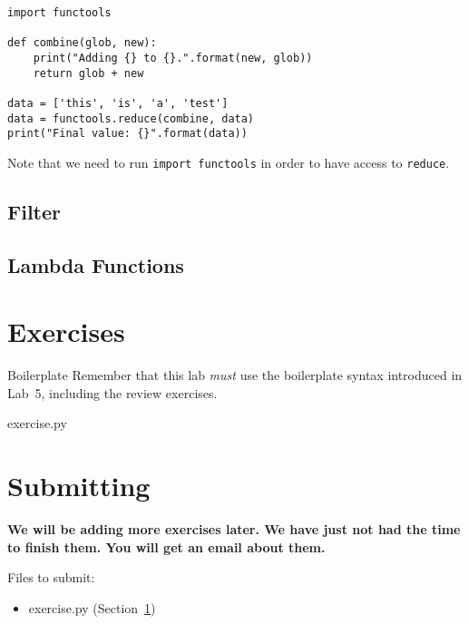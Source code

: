 \documentclass[11pt]{cselabheader}
\begin{document}
\begin{lstlisting}[style=python]
import functools

def combine(glob, new):
    print("Adding {} to {}.".format(new, glob))
    return glob + new

data = ['this', 'is', 'a', 'test']
data = functools.reduce(combine, data)
print("Final value: {}".format(data))
\end{lstlisting}

Note that we need to run \lstinline{import functools} in order to have access to \lstinline{reduce}.

\subsection{Filter}
\label{subsec:filter}


\subsection{Lambda Functions}
\label{subsec:lambda}



\pagebreak


\section{Exercises}
\label{sec:ex}

\begin{warningbox}{Boilerplate}
  Remember that this lab \emph{must} use the
  boilerplate syntax introduced in Lab~5, including the review exercises.
\end{warningbox}

\begin{description}
  \item[exercise.py]

\end{description}

\pagebreak
\section{Submitting}

\begin{center}
  \textbf{We will be adding more exercises later. We have just not had the time
  to finish them. You will get an email about them.}
\end{center}

Files to submit:
\begin{itemize}
  \item exercise.py (Section~\ref{sec:ex})
\end{itemize}
\end{document}
